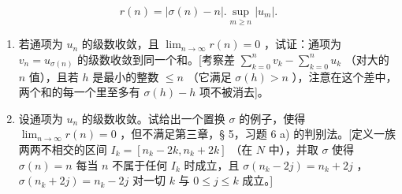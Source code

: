 \[
r (n) = | \sigma (n) - n |. \sup _ {m \geqslant n} | u _ {m} |.
\]

\begin{enumerate}
\def\labelenumi{\alph{enumi})}
\item
若通项为 \(u_n\) 的级数收敛，且 \(\lim_{n \to \infty} r(n) = 0\) ，试证：通项为 \(v_n = u_{\sigma(n)}\) 的级数收敛到同一个和。{[}考察差 \(\sum_{k=0}^{n} v_k - \sum_{k=0}^{n} u_k\) （对大的 \(n\) 值），且若 \(h\) 是最小的整数 \(\leqslant n\) （它满足 \(\sigma(h) > n\) ），注意在这个差中，两个和的每一个里至多有 \(\sigma(h) - h\) 项不被消去{]}。
\item
设通项为 \(u_n\) 的级数收敛。试给出一个置换 \(\sigma\) 的例子，使得 \(\lim_{n \to \infty} r(n) = 0\) ，但不满足第三章，§ 5，习题 6 a) 的判别法。{[}定义一族两两不相交的区间 \(I_k = [n_k - 2k, n_k + 2k]\) （在 \(N\) 中），并取 \(\sigma\) 使得 \(\sigma(n) = n\) 每当 \(n\) 不属于任何 \(I_k\) 时成立，且 \(\sigma(n_k - 2j) = n_k + 2j\) ， \(\sigma(n_k + 2j) = n_k - 2j\) 对一切 \(k\) 与 \(0 \leqslant j \leqslant k\) 成立。{]}
\end{enumerate}

